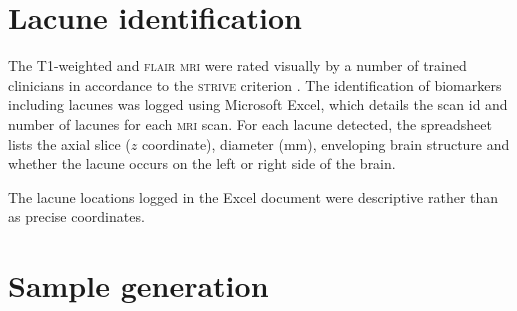 \section{Lacune identification}\label{data-lacune}

The T1-weighted and \textsc{flair} \textsc{mri} were rated visually by a number of trained clinicians in accordance to the \textsc{strive} criterion \cite{WardlawJ.M.2013Nsfr}. The identification of biomarkers including lacunes was logged using Microsoft Excel, which details the scan id and number of lacunes for each \textsc{mri} scan. For each lacune detected, the spreadsheet lists the axial slice ($z$ coordinate), diameter (mm), enveloping brain structure and whether the lacune occurs on the left or right side of the brain.


The lacune locations logged in the Excel document were descriptive rather than as precise coordinates. 

\section{Sample generation}\label{data-samples}

%
%
%
%

%
%
%
%
%
%
%
%
%

\cite{Yokoyama2007}


%